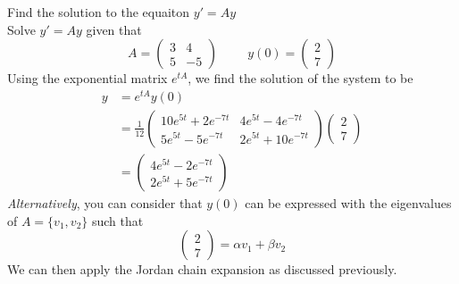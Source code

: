 \documentclass[journal, letterpaper]{IEEEtran}
\begin{document}
    \begin{myboxg}{Find the solution to the equaiton $y' = Ay$} \\ 
        Solve $y' = Ay$ given that
        $$ A = \begin{pmatrix}
            3 & 4 \\ 5 & -5
        \end{pmatrix} \hspace{1cm} y(0) = \begin{pmatrix}
            2 \\ 7
        \end{pmatrix}$$
        Using the exponential matrix $e^{tA}$, we find the solution of the system to be
        \begin{align*}
        y &= e^{tA}y(0) \\ 
            &= \frac{1}{12}\begin{pmatrix}
            10e^{5t} + 2e^{-7t} & 4e^{5t} - 4e^{-7t} \\
            5e^{5t} - 5e^{-7t} & 2e^{5t} + 10e^{-7t}
        \end{pmatrix}\begin{pmatrix}
            2 \\ 7
        \end{pmatrix} \\
        &= \begin{pmatrix}
            4e^{5t} - 2e^{-7t} \\
            2e^{5t} + 5e^{-7t}
        \end{pmatrix}
        \end{align*}
        \textit{Alternatively}, you can consider that $y(0)$ can be expressed with the eigenvalues of $A = \{v_1, v_2\}$ such that
        $$ \begin{pmatrix}
            2 \\ 7
        \end{pmatrix} = \alpha v_1 + \beta v_2$$
        We can then apply the Jordan chain expansion as discussed previously.
    \end{myboxg}
\end{document}
